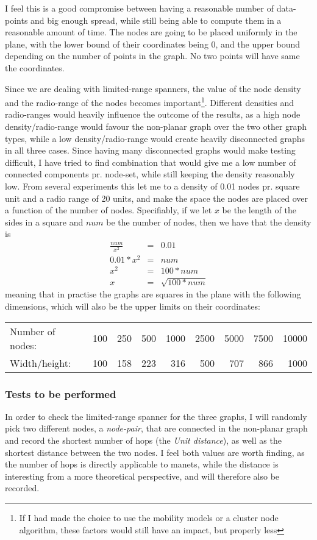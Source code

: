 I feel this is a good compromise between having a reasonable number of data-points and big enough spread, while still being able to compute them in a reasonable amount of time. The nodes are going to be placed uniformly in the plane, with the lower bound of their coordinates being 0, and the upper bound depending on the number of points in the graph. No two points will have same the coordinates. 

Since we are dealing with limited-range spanners, the value of the node density and the radio-range of the nodes becomes important\footnote{If I had made the choice to use the mobility models or a cluster node algorithm, these factors would still have an impact, but properly less}. Different densities and radio-ranges would heavily influence the outcome of the results, as a high node density/radio-range would favour the non-planar graph over the two other graph types, while a low density/radio-range would create heavily disconnected graphs in all three cases. Since having many disconnected graphs would make testing difficult, I have tried to find combination that would give me a low number of connected components pr. node-set, while still keeping the density reasonably low. From several experiments this let me to a density of 0.01 nodes pr. square unit and a radio range of 20 units, and make the space the nodes are placed over a function of the number of nodes. Specifiably, if we let $x$ be the length of the sides in a square and $num$ be the number of nodes, then we have that the density is
\begin{eqnarray}
\frac{num}{x^2} &=& 0.01 \\
0.01 * x^2 &=& num \\
x^2 &=& 100 * num\\
x &=& \sqrt{100 * num}  
\end{eqnarray}
meaning that in practise the graphs are squares in the plane with the following dimensions, which will also be the upper limits on their coordinates:

\begin{tabular}{lrrrrrrrr}
Number of nodes: & 100 & 250 & 500 & 1000 & 2500 & 5000 & 7500 & 10000 \\
Width/height:    & 100 & 158 & 223 &  316 &  500 &  707 &  866 &  1000 
\end{tabular} 

\subsubsection{Tests to be performed}
In order to check the limited-range spanner for the three graphs, I will randomly pick two different nodes, a \emph{node-pair}, that are connected in the non-planar graph and record the shortest number of hops (the \emph{Unit distance}), as well as the shortest distance between the two nodes. I feel both values are worth finding, as the number of hops is directly applicable to \acp{manet}, while the distance is interesting from a more theoretical perspective, and will therefore also be recorded.

